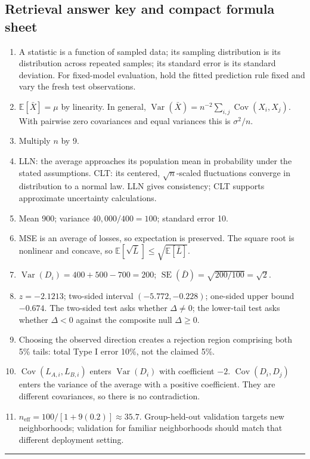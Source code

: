 \documentclass[11pt,letterpaper]{article}
\newcommand{\E}{\mathbb E}
\newcommand{\Var}{\operatorname{Var}}
\newcommand{\Cov}{\operatorname{Cov}}
\newcommand{\SE}{\operatorname{SE}}
\theoremstyle{definition}
\theoremstyle{remark}
\numberwithin{equation}{section}
\begin{document}
\subsection{Retrieval answer key and compact formula sheet}
\begin{enumerate}[label=\textbf{\arabic*.},itemsep=6pt]
\item A statistic is a function of sampled data; its sampling distribution is
its distribution across repeated samples; its standard error is its standard
deviation. For fixed-model evaluation, hold the fitted prediction rule fixed
and vary the fresh test observations.
\item $\E[\bar X]=\mu$ by linearity. In general,
$\Var(\bar X)=n^{-2}\sum_{i,j}\Cov(X_i,X_j)$.
With pairwise zero covariances and equal variances this is $\sigma^2/n$.
\item Multiply $n$ by 9.
\item LLN: the average approaches its population mean in probability under
the stated assumptions. CLT: its centered, $\sqrt n$-scaled fluctuations
converge in distribution to a normal law. LLN gives consistency; CLT supports
approximate uncertainty calculations.
\item Mean 900; variance $40{,}000/400=100$; standard error 10.
\item MSE is an average of losses, so expectation is preserved. The square
root is nonlinear and concave, so $\E[\sqrt{\bar L}]\leq\sqrt{\E[\bar L]}$.
\item $\Var(D_i)=400+500-700=200$; $\SE(\bar D)=\sqrt{200/100}=\sqrt2$.
\item $z=-2.1213$; two-sided interval $(-5.772,-0.228)$; one-sided upper
bound $-0.674$. The two-sided test asks whether $\Delta\neq0$; the lower-tail
test asks whether $\Delta<0$ against the composite null $\Delta\geq0$.
\item Choosing the observed direction creates a rejection region comprising
both 5\% tails: total Type I error 10\%, not the claimed 5\%.
\item $\Cov(L_{A,i},L_{B,i})$ enters $\Var(D_i)$ with coefficient $-2$.
$\Cov(D_i,D_j)$ enters the variance of the average with a positive coefficient.
They are different covariances, so there is no contradiction.
\item $n_{\mathrm{eff}}=100/[1+9(0.2)]\approx35.7$. Group-held-out validation
targets new neighborhoods; validation for familiar neighborhoods should match
that different deployment setting.
\end{enumerate}
\vspace{3pt}\hrule\vspace{5pt}
\end{document}

